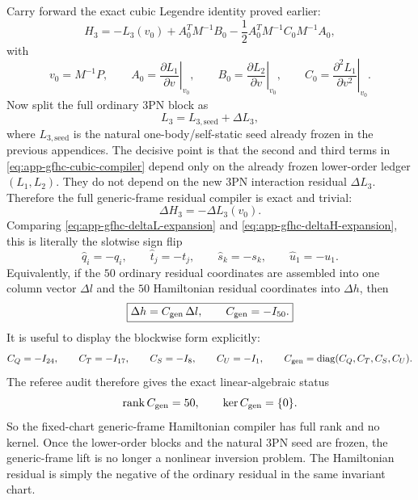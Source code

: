 \documentclass[11pt]{article}
\begin{document}
Carry forward the exact cubic Legendre identity proved earlier:
\begin{equation}
H_3=-L_3(v_0)+A_0^TM^{-1}B_0-\frac12A_0^TM^{-1}C_0M^{-1}A_0,
\label{eq:app-gfhc-cubic-compiler}
\end{equation}
with
\begin{equation}
 v_0=M^{-1}P,
 \qquad
 A_0=\left.\frac{\partial L_1}{\partial v}\right|_{v_0},
 \qquad
 B_0=\left.\frac{\partial L_2}{\partial v}\right|_{v_0},
 \qquad
 C_0=\left.\frac{\partial^2L_1}{\partial v^2}\right|_{v_0}.
\label{eq:app-gfhc-cubic-data}
\end{equation}
Now split the full ordinary $3$PN block as
\begin{equation}
L_3=L_{3,\mathrm{seed}}+\Delta L_3,
\label{eq:app-gfhc-seed-plus-residual}
\end{equation}
where $L_{3,\mathrm{seed}}$ is the natural one-body/self-static seed already
frozen in the previous appendices.  The decisive point is that the second and
third terms in \eqref{eq:app-gfhc-cubic-compiler} depend only on the already
frozen lower-order ledger $(L_1,L_2)$.  They do not depend on the new $3$PN
interaction residual $\Delta L_3$.  Therefore the full generic-frame residual
compiler is exact and trivial:
\begin{equation}
\boxed{\Delta H_3=-\Delta L_3(v_0).}
\label{eq:app-gfhc-residual-compiler}
\end{equation}
Comparing \eqref{eq:app-gfhc-deltaL-expansion} and
\eqref{eq:app-gfhc-deltaH-expansion}, this is literally the slotwise sign flip
\begin{equation}
\boxed{
\hat q_i=-q_i,
\qquad
\hat t_j=-t_j,
\qquad
\hat s_k=-s_k,
\qquad
\hat u_1=-u_1.}
\label{eq:app-gfhc-slotwise-signflip}
\end{equation}
Equivalently, if the $50$ ordinary residual coordinates are assembled into one
column vector $\Delta l$ and the $50$ Hamiltonian residual coordinates into
$\Delta h$, then
\begin{equation}
\boxed{
\Delta h=C_{\rm gen}\,\Delta l,
\qquad
C_{\rm gen}=-I_{50}.}
\label{eq:app-gfhc-compiler-matrix}
\end{equation}
It is useful to display the blockwise form explicitly:
\begin{equation}
C_Q=-I_{24},
\qquad
C_T=-I_{17},
\qquad
C_S=-I_{8},
\qquad
C_U=-I_1,
\qquad
C_{\rm gen}=\mathrm{diag}(C_Q,C_T,C_S,C_U).
\label{eq:app-gfhc-blockwise-compiler}
\end{equation}
The referee audit therefore gives the exact linear-algebraic status
\begin{equation}
\operatorname{rank}C_{\rm gen}=50,
\qquad
\ker C_{\rm gen}=\{0\}.
\label{eq:app-gfhc-rank-nullity}
\end{equation}
So the fixed-chart generic-frame Hamiltonian compiler has full rank and no
kernel.  Once the lower-order blocks and the natural $3$PN seed are frozen, the
generic-frame lift is no longer a nonlinear inversion problem.  The Hamiltonian
residual is simply the negative of the ordinary residual in the same invariant
chart.
\end{document}
